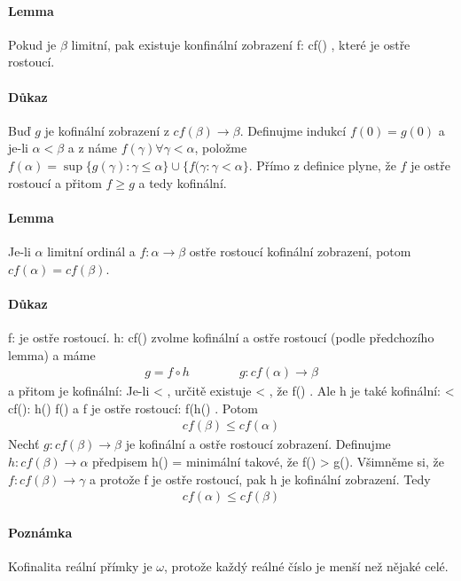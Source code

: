 \documentclass[a4paper,12pt,titlepage]{article}
\begin{document}
\begin{enumerate}
\paragraph{Lemma}
Pokud je $\beta$ limitní, pak existuje konfinální zobrazení f: cf(\beta) \to
\beta, které je ostře rostoucí.
\paragraph{Důkaz}
Buď $g$ je kofinální zobrazení z $cf(\beta) \to \beta$. Definujme indukcí $f(0) =
g(0)$ a je-li $\alpha < \beta$ a z náme $f(\gamma) \forall \gamma < \alpha$,
položme $f(\alpha) = \sup\{g(\gamma) : \gamma \le \alpha \} \cup \{ f(\gamma:
\gamma < \alpha \}$. Přímo z definice plyne, že $f$ je ostře rostoucí a přitom $f
\ge g$ a tedy kofinální.
\paragraph{Lemma}
Je-li $\alpha$ limitní ordinál a $f : \alpha \to \beta$ ostře rostoucí kofinální
zobrazení, potom $cf(\alpha) = cf(\beta)$.
\paragraph{Důkaz}
f: \alpha \to \beta je ostře rostoucí. h: cf(\alpha) \to \alpha zvolme kofinální
a ostře rostoucí (podle předchozího lemma) a máme
\begin{align}
	g = f \circ h \qquad \qquad g: cf(\alpha) \to \beta
\end{align}
a přitom je kofinální: Je-li \gamma < \beta, určitě existuje \delta < \alpha, že
f(\delta) \ge \gamma. Ale h je také kofinální: \exists \etha < cf(\alpha):
h(\etha) \ge f(\delta) a f je ostře rostoucí: f(h(\etha) \ge \gamma. Potom
\begin{align}
	cf(\beta) \le cf(\alpha)
\end{align}
Nechť $g: cf(\beta) \to \beta$ je kofinální a ostře rostoucí zobrazení.
Definujme $h: cf(\beta) \to \alpha$ předpisem h(\xi) = minimální \gamma \in
\alpha takové, že f(\gamma) > g(\gamma). Všimněme si, že $f: cf(\beta) \to
\gamma$ a protože f je ostře rostoucí, pak h je kofinální zobrazení. Tedy 
\begin{align}
	cf(\alpha) \le cf(\beta)
\end{align}
\paragraph{Poznámka}
Kofinalita reální přímky je $\omega$, protože každý reálné číslo je menší než
nějaké celé.

\end{enumerate}
\end{document}
